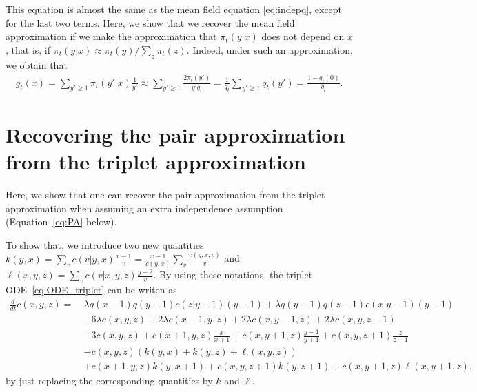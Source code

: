 \documentclass[acmsmall,nonacm]{acmart}
\begin{document}
This equation is almost the same as the mean field equation \eqref{eq:indepq}, except for the last two terms.
Here, we show that we recover the mean field approximation if we make the approximation that $\pi_t(y|x)$ does not depend on $x$, that is,
if $\pi_t(y|x) \approx \pi_t(y)/\sum_z \pi_t(z)$. 
Indeed, under such an approximation, we obtain that 
\begin{align*}
    g_t(x) = \sum_{y' \geq 1} \pi_t(y'|x)\frac{1}{y'} \approx \sum_{y'\ge1} \frac{2\pi_t(y')}{y'\bar{q}_t} = \frac{1}{\bar{q}_t}\sum_{y'\ge1} q_t(y')=\frac{1-q_t(0)}{\bar{q}_t}.
\end{align*}


\section{Recovering the pair approximation from the triplet approximation}
\label{apx:pair from triplet}

Here, we show that one can recover the pair approximation from the triplet approximation when assuming an extra independence assumption (Equation~\eqref{eq:PA} below).

To show that, we introduce two new quantities $k(y,x)=\sum_v c(v|y,x) \frac{x-1}{v}=\frac{x-1}{c(y,x)}\sum_{v} \frac{c(y,x,v)}{v}$ and $\ell(x,y,z)=\sum_v c(v|x,y,z) \frac{y-2}{v}$. By using these notations, the triplet ODE~\eqref{eq:ODE_triplet} can be writen as
\begin{align*} %
    \frac{d}{dt} c(x,y,z) = ~&\lambda q(x-1)q(y-1)c(z|y-1)(y-1) + \lambda q(y-1)q(z-1)c(x|y-1) (y-1) \nonumber\\
    & -6\lambda c(x,y,z) + 2\lambda c(x-1,y,z) + 2\lambda c(x,y-1,z) +2\lambda c(x,y,z-1)\nonumber \\
    &-3 c(x,y,z) + c(x+1,y,z)\frac{x}{x+1}+ c(x,y+1,z)\frac{y-1}{y+1} + c(x,y,z+1)\frac{z}{z+1} \nonumber\\
    &-c(x,y,z) \left(k(y,x)  + k(y,z) + \ell(x,y,z) \right)\nonumber \\
    &+c(x+1,y,z) k(y, x+1) +c(x,y,z+1) k(y, z+1) +c(x,y+1,z) \ell(x,y+1,z),
\end{align*}
by just replacing the corresponding quantities by $k$ and $\ell$. 
\end{document}
